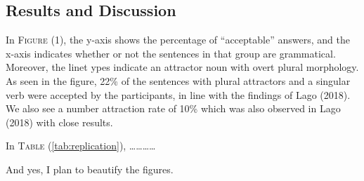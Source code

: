 \documentclass[11pt,a4paper]{article}
\begin{document}
\hypertarget{results-and-discussion}{%
\subsection{Results and Discussion}\label{results-and-discussion}}

In \textsc{Figure} (1), the y-axis shows the percentage of
``acceptable'' answers, and the x-axis indicates whether or not the
sentences in that group are grammatical. Moreover, the linet ypes
indicate an attractor noun with overt plural morphology. As seen in the
figure, 22\% of the sentences with plural attractors and a singular verb
were accepted by the participants, in line with the findings of Lago
(2018). We also see a number attraction rate of 10\% which was also
observed in Lago (2018) with close results.

In \textsc{Table} (\ref{tab:replication}),
\ldots{}\ldots{}\ldots{}\ldots{}

And yes, I plan to beautify the figures.

\begin{figure}[H]
  \begin{floatrow}

  \end{floatrow}
\end{figure}
\end{document}

